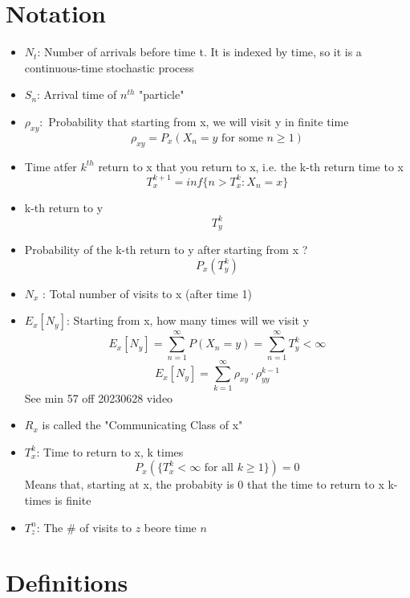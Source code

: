 \documentclass{report}
\begin{document}
{{\begin{itemize}
      \end{itemize}
  }
    


    
\chapter*{Notation}%
  \begin{itemize}
      \item $N_t$: Number of arrivals before time t.  It is indexed by
        time, so it is a continuous-time stochastic process
      \item $S_n$: Arrival time of $n^{th}$ "particle"
      \item $\rho_{xy}: $ Probability that starting from x, we will visit y in finite time
        \[ \rho_{xy} = P_x(X_n = y \text{ for some  } n \geq 1) \]
      \item Time atfer $k^{th}$ return to x that you return to x, i.e. the k-th return time to x
        \[ T^{k+1}_x = inf \{n > T_x^k : X_n = x \}  \]
      \item k-th return to y
        \[ T^k_y \]
      \item Probability of the k-th return to y after starting from x ?
        \[ P_x(T^k_y) \]
      \item $N_x$ : Total number of visits to x (after time 1)
      \item $E_x[N_y]$: Starting from x, how many times will we visit y
          \[ E_x[N_y] = \sum^{\infty}_{n=1} P(X_n=y) = \sum^{\infty}_{n=1} T_y^k < \infty  \]
          \[ E_x[N_y] = \sum^{\infty}_{k=1} \rho_{xy} \cdot \rho^{k-1}_{yy}   \]
            See min 57 off 20230628 video
      \item $R_x$ is called the "Communicating Class of x"
      \item $T^k_x$: Time to return to x, k times
        \[ P_x(\{T^k_x < \infty \text{ for all } k \geq 1\}) = 0 \]
        Means that, starting at x, the probabity is 0 that the time to return to x k-times is finite
      \item $T_z^n$: The \# of visits to $z$ beore time $n$
  \end{itemize}

\chapter*{Definitions}%

}
\end{document}
